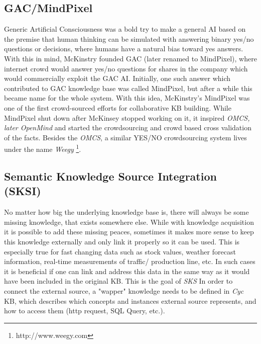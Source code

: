 \subsection{GAC/MindPixel}
Generic Artificial Consciousness was a bold try to make a general AI based on
the premise that human thinking can be simulated with answering binary yes/no
questions or decisions\parencite{McKinstry2018}, where humans have a natural 
bias toward yes answers. With this in mind, McKinstry founded GAC (later renamed
to MindPixel), where internet crowd would answer yes/no questions for shares
in the company which would commercially exploit the GAC AI. Initially, one such
answer which contributed to GAC knowledge base was called MindPixel, but after
a while this became name for the whole system. With this idea, McKinstry's
MindPixel was one of the first crowd-sourced efforts for collaborative KB
building. While MindPixel shut down after McKinsey stopped working on it,
it inspired \emph{OMCS, later OpenMind} and started the crowdsourcing and
crowd based cross validation of the facts. Besides the \emph{OMCS}, a similar
YES/NO crowdsourcing system lives under the name \emph{Weegy}
\footnote{http://www.weegy.com}.

\subsection{Semantic Knowledge Source Integration (SKSI)}
No matter how big the underlying knowledge base is, there will always be some
missing knowledge, that exists somewhere else. While with knowledge acquisition
it is possible to add these missing peaces, sometimes it makes more sense to
keep this knowledge externally and only link it properly so it can be used.
This is especially true for fast changing data such as stock values, weather
forecast information, real-time measurements of traffic/ production line, etc.
In such cases it is beneficial if one can link and address this data in the 
same way as it would have been included in the original KB. This is the goal
of \emph{SKS}\parencite{Masters2007}
In order to connect the external source, a "wapper" knowledge needs to be
defined in \emph{Cyc} KB, which describes which concepts and instances external
source represents, and how to access them (http request, SQL Query, etc.).

